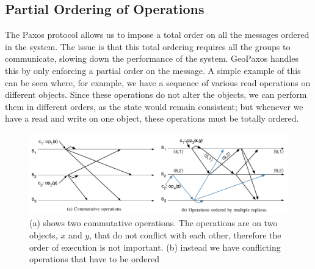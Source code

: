

\subsection{Partial Ordering of Operations}
The Paxos protocol allows us to impose a total order on all the messages ordered in the system. The issue is that this total ordering requires all the groups to communicate, slowing down the performance of the system. GeoPaxos handles this by only enforcing a partial order on the message.
A simple example of this can be seen where, for example, we have a sequence of various read operations on different objects. Since these operations do not alter the objects, we can perform them in different orders, as the state would remain consistent; but whenever we have a read and write on one object, these operations must be totally ordered.

\begin{figure}[htb]
  \centering
  \includegraphics[width=\textwidth,height=\textheight,keepaspectratio]{img/partial-ordering.png}

  \caption{ (a) shows two commutative operations. The operations are on two objects, $x$ and $y$, that do not conflict with each other, therefore the order of execution is not important. (b) instead we have conflicting operations that have to be ordered }
  \label{fig:partial-ordering}
\end{figure}

